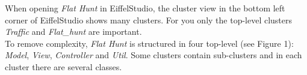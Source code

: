 When opening \emph{Flat Hunt} in EiffelStudio, the cluster view in the bottom left corner of EiffelStudio shows many clusters. For you only the top-level clusters \emph{Traffic} and \emph{Flat\_hunt} are important.\\

To remove complexity, \emph{Flat Hunt} is structured in four top-level (see Figure 1): \emph{Model}, \emph{View}, \emph{Controller} and \emph{Util}. Some clusters contain sub-clusters and in each cluster there are several classes.
